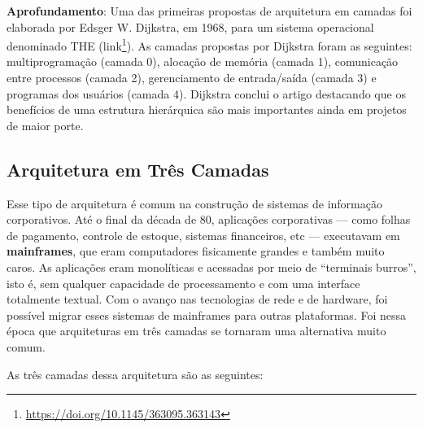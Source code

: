 \documentclass[
  11pt,
  twoside]{book}
\DeclareRobustCommand{\href}[2]{#2\footnote{\url{#1}}}
\newenvironment{esmbox}{\centering \vspace{1.5ex} \begin{tcolorbox}[breakable, colback=backcolor, width=4.9in]}{\end{tcolorbox} \vspace{1.5ex}}
\begin{document}
 

\begin{esmbox}

\textbf{Aprofundamento}: Uma das primeiras propostas de arquitetura em
camadas foi elaborada por Edsger W. Dijkstra, em 1968, para um sistema
operacional denominado THE
(\href{https://doi.org/10.1145/363095.363143}{link}). As camadas
propostas por Dijkstra foram as seguintes: multiprogramação (camada 0),
alocação de memória (camada 1), comunicação entre processos (camada 2),
gerenciamento de entrada/saída (camada 3) e programas dos usuários
(camada 4). Dijkstra conclui o artigo destacando que os benefícios de
uma estrutura hierárquica são mais importantes ainda em projetos de
maior porte.

\end{esmbox}

\hypertarget{arquitetura-em-truxeas-camadas}{%
\subsection{Arquitetura em Três
Camadas}\label{arquitetura-em-truxeas-camadas}}


 Esse tipo de arquitetura é comum na construção de
sistemas de informação corporativos. Até o final da década de 80,
aplicações corporativas --- como folhas de pagamento, controle de
estoque, sistemas financeiros, etc --- executavam em
\textbf{mainframes}, que eram computadores fisicamente grandes e também
muito caros. As aplicações eram monolíticas e acessadas por meio de
``terminais burros'', isto é, sem qualquer capacidade de processamento e
com uma interface totalmente textual. Com o avanço nas tecnologias de
rede e de hardware, foi possível migrar esses sistemas de mainframes
para outras plataformas. Foi nessa época que arquiteturas em três
camadas se tornaram uma alternativa muito comum.

As três camadas dessa arquitetura são as seguintes:
\end{document}
